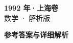 \documentclass[zihao=-4, a4paper]{ctexart}
\begin{document}
\begin{center}
  {\Large\bfseries 1992 年·上海卷}\\[4pt]
  {\large 数学 · 解析版}
\end{center}
\medskip
{}

\clearpage
{}
\begin{center}{\Large\bfseries 参考答案与详细解析}\end{center}
\medskip

\end{document}
